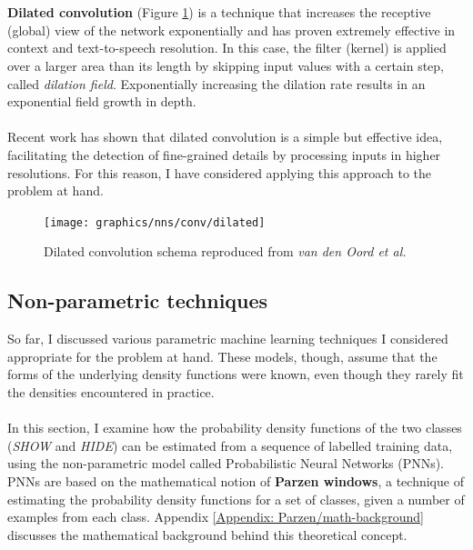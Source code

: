 	\\ \\
	\textbf{Dilated convolution} (Figure \ref{Fig: prep/ml/cnn/dilated}) is a technique that increases the receptive (global) view of the network exponentially and has proven extremely effective in context and text-to-speech resolution. In this case, the filter (kernel) is applied over a larger area than its length by skipping input values with a certain step, called \textit{dilation field}. Exponentially increasing the dilation rate results in an exponential field growth in depth\cite{DBLP:journals/corr/YuK15}.  
	\\ \\
	Recent work has shown that dilated convolution is a simple but effective idea, facilitating the detection of fine-grained details by processing inputs in higher resolutions. For this reason, I have considered applying this approach to the problem at hand.
	
	\begin{figure}[H]
		\centering
		\texttt{[image: graphics/nns/conv/dilated]}
		\caption[Dilated convolution]{Dilated convolution schema reproduced from \textit{van den Oord et al.} \citep{DBLP:journals/corr/OordDZSVGKSK16}}
		\label{Fig: prep/ml/cnn/dilated}
	\end{figure}
	
	\subsection{Non-parametric techniques}	\label{Section 2.2.5}
	So far, I discussed various parametric machine learning techniques I considered appropriate for the problem at hand. These models, though, assume that the forms of the underlying density functions were known, even though they rarely fit the densities encountered in practice. 
	\\ \\
	In this section, I examine how the probability density functions of the two classes (\textit{SHOW} and \textit{HIDE}) can be estimated from a sequence of labelled training data, using the non-parametric model called Probabilistic Neural Networks (PNNs). PNNs are based on the mathematical notion of \textbf{Parzen windows}, a technique of estimating the probability density functions for a set of classes, given a number of examples from each class. Appendix \ref{Appendix: Parzen/math-background} discusses the mathematical background behind this theoretical concept.
	
